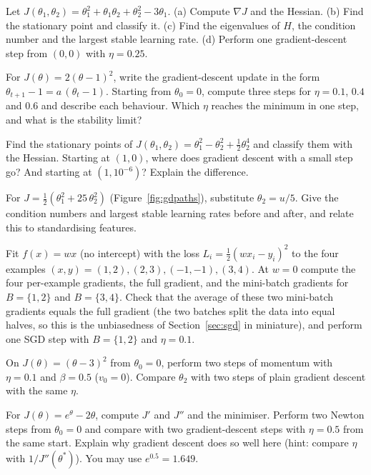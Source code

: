 \documentclass[11pt]{article}
\begin{document}
\begin{questions}
\begin{calculations}
\item Let $J(\theta_1, \theta_2) = \theta_1^2 + \theta_1\theta_2 + \theta_2^2 - 3\theta_1$. (a) Compute $\nabla J$ and
the Hessian. (b) Find the stationary point and classify it. (c) Find the eigenvalues of $H$, the condition number and
the largest stable learning rate. (d) Perform one gradient-descent step from $(0, 0)$ with $\eta = 0.25$.
\item For $J(\theta) = 2(\theta - 1)^2$, write the gradient-descent update in the form
$\theta_{t+1} - 1 = a\,(\theta_t - 1)$. Starting from $\theta_0 = 0$, compute three steps for $\eta = 0.1$, $0.4$ and
$0.6$ and describe each behaviour. Which $\eta$ reaches the minimum in one step, and what is the stability limit?
\item Find the stationary points of $J(\theta_1, \theta_2) = \theta_1^2 - \theta_2^2 + \frac12\theta_2^4$ and classify
them with the Hessian. Starting at $(1, 0)$, where does gradient descent with a small step go? And starting at
$(1, 10^{-6})$? Explain the difference.
\item For $J = \frac12(\theta_1^2 + 25\,\theta_2^2)$ (Figure~\ref{fig:gdpaths}), substitute $\theta_2 = u/5$. Give the
condition numbers and largest stable learning rates before and after, and relate this to standardising features.
\item Fit $f(x) = wx$ (no intercept) with the loss $L_i = \frac12(wx_i - y_i)^2$ to the four examples
$(x, y) = (1, 2), (2, 3), (-1, -1), (3, 4)$. At $w = 0$ compute the four per-example gradients, the full gradient,
and the mini-batch gradients for $B = \{1, 2\}$ and $B = \{3, 4\}$. Check that the average of these two mini-batch
gradients equals the full gradient (the two batches split the data into equal halves, so this is the unbiasedness
of Section~\ref{sec:sgd} in miniature), and perform one SGD step with $B = \{1, 2\}$ and $\eta = 0.1$.
\item On $J(\theta) = (\theta - 3)^2$ from $\theta_0 = 0$, perform two steps of momentum with $\eta = 0.1$ and
$\beta = 0.5$ ($v_0 = 0$). Compare $\theta_2$ with two steps of plain gradient descent with the same $\eta$.
\item For $J(\theta) = e^\theta - 2\theta$, compute $J'$ and $J''$ and the minimiser. Perform two Newton steps from
$\theta_0 = 0$ and compare with two gradient-descent steps with $\eta = 0.5$ from the same start. Explain why gradient
descent does so well here (hint: compare $\eta$ with $1/J''(\theta^*)$). You may use $e^{0.5} = 1.649$.

\end{calculations}
\end{questions}
\end{document}
